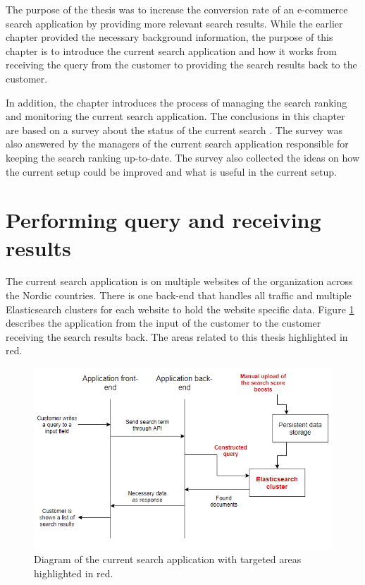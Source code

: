 

The purpose of the thesis was to increase the conversion rate of an e-commerce search application 
by providing more relevant search results. 
While the earlier chapter provided the necessary background information, the purpose
of this chapter is to introduce the current search application and how it works
from receiving the query from the customer to providing the search results back to the customer. 


In addition, the chapter introduces the process of managing 
the search ranking and monitoring the current search application.
The conclusions in this chapter are based on a survey about the status of the current search \cite{searchSurvey}.
The survey was also answered by the managers of the current search application responsible for keeping
the search ranking up-to-date.
The survey also collected the ideas on how the current setup could be improved and 
what is useful in the current setup.


\section{Performing query and receiving results}

The current search application is on multiple websites of the organization across the Nordic countries. 
There is one back-end that handles all traffic and multiple Elasticsearch clusters for each website to 
hold the website specific data. Figure \ref{fig:current-solution} describes the application
from the input of the customer to the customer receiving the search results back.
The areas related to this thesis highlighted in red.

\begin{figure}
    \centering
    \includegraphics[width=\textwidth]{img/current-solution.png}
    \caption{Diagram of the current search application with targeted areas highlighted in red.}
    \label{fig:current-solution}
\end{figure}

